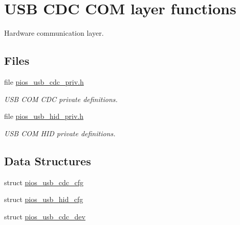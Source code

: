 \hypertarget{group___p_i_o_s___u_s_b___c_o_m}{\section{U\-S\-B C\-D\-C C\-O\-M layer functions}
\label{group___p_i_o_s___u_s_b___c_o_m}
}


Hardware communication layer.  


\subsection*{Files}
\begin{DoxyCompactItemize}
\item 
file \hyperlink{pios__usb__cdc__priv_8h}{pios\-\_\-usb\-\_\-cdc\-\_\-priv.\-h}
\begin{DoxyCompactList}\small\item\em U\-S\-B C\-O\-M C\-D\-C private definitions. \end{DoxyCompactList}\item 
file \hyperlink{pios__usb__hid__priv_8h}{pios\-\_\-usb\-\_\-hid\-\_\-priv.\-h}
\begin{DoxyCompactList}\small\item\em U\-S\-B C\-O\-M H\-I\-D private definitions. \end{DoxyCompactList}\end{DoxyCompactItemize}
\subsection*{Data Structures}
\begin{DoxyCompactItemize}
\item 
struct \hyperlink{structpios__usb__cdc__cfg}{pios\-\_\-usb\-\_\-cdc\-\_\-cfg}
\item 
struct \hyperlink{structpios__usb__hid__cfg}{pios\-\_\-usb\-\_\-hid\-\_\-cfg}
\item 
struct \hyperlink{structpios__usb__cdc__dev}{pios\-\_\-usb\-\_\-cdc\-\_\-dev}
\end{DoxyCompactItemize}
